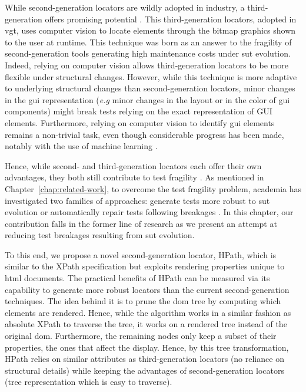 While second-generation locators are wildly adopted in industry, a third-generation offers promising potential \cite{Alegroth2015}. This third-generation locators, adopted in \gls{vgt}, uses computer vision to locate elements through the bitmap graphics shown to the user at runtime. This technique was born as an answer to the fragility of second-generation tools generating high maintenance costs under \gls{sut} evolution. Indeed, relying on computer vision allows third-generation locators to be more flexible under structural changes. However, while this technique is more adaptive to underlying structural changes than second-generation locators, minor changes in the \gls{gui} representation (\emph{e.g} minor changes in the layout or in the color of \gls{gui} components) might break tests relying on the exact representation of GUI elements. Furthermore, relying on computer vision to identify \gls{gui} elements remains a non-trivial task, even though considerable progress has been made, notably with the use of machine learning \cite{White2019}.

Hence, while second- and third-generation locators each offer their own advantages, they both still contribute to test fragility \cite{Aldalur2017, Alegroth2018}. As mentioned in Chapter~\ref{chap:related-work}, to overcome the test fragility problem, academia has investigated two families of approaches: generate tests more robust to \gls{sut} evolution \cite{Montoto2011, Thummalapenta2013, Leotta2014, Yandrapally2014, Leotta2015, Leotta2016, Zheng2018} or automatically repair tests following breakages \cite{Choudhary2011, Stocco2018, Kirinuki2019}. In this chapter, our contribution falls in the former line of research as we present an attempt at reducing test breakages resulting from \gls{sut} evolution. 

To this end, we propose a novel second-generation locator, HPath, which is similar to the XPath specification but exploits rendering properties unique to \gls{html} documents. The practical benefits of HPath can be measured via its capability to generate more robust locators than the current second-generation techniques. The idea behind it is to prune the \gls{dom} tree by computing which elements are rendered. Hence, while the algorithm works in a similar fashion as absolute XPath to traverse the tree, it works on a rendered tree instead of the original \gls{dom}. Furthermore, the remaining nodes only keep a subset of their properties, the ones that affect the display. Hence, by this tree transformation, HPath relies on similar attributes as third-generation locators (no reliance on structural details) while keeping the advantages of second-generation locators (tree representation which is easy to traverse).

